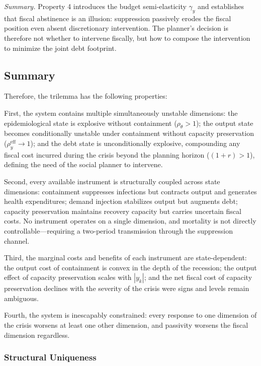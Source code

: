 \documentclass[12pt, a4paper]{article}
\begin{document}
\vspace{5mm}

\noindent\textit{Summary.} Property 4 introduces the budget semi-elasticity $\gamma_y$ and establishes that fiscal abstinence is an illusion: suppression passively erodes the fiscal position even absent discretionary intervention. The planner's decision is therefore not whether to intervene fiscally, but how to compose the intervention to minimize the joint debt footprint. 

\subsection{Summary}
\label{sec:Sumary}
Therefore, the trilemma has the following properties: 

First, the system contains multiple simultaneously unstable dimensions: the epidemiological state is explosive without containment ($\rho_\theta > 1$); the output state becomes conditionally unstable under containment without capacity preservation ($\rho_y^{\text{eff}} \to 1$); and the debt state is unconditionally explosive, compounding any fiscal cost incurred during the crisis beyond the planning horizon ($(1+r) > 1$), defining the need of the social planner to intervene. 

Second, every available instrument is structurally coupled across state dimensions: containment suppresses infections but contracts output and generates health expenditures; demand injection stabilizes output but augments debt; capacity preservation maintains recovery capacity but carries uncertain fiscal costs. No instrument operates on a single dimension, and mortality is not directly controllable---requiring a two-period transmission through the suppression channel. 

Third, the marginal costs and benefits of each instrument are state-dependent: the output cost of containment is convex in the depth of the recession; the output effect of capacity preservation scales with $|y_k|$; and the net fiscal cost of capacity preservation declines with the severity of the crisis were signs and levels remain ambiguous.

Fourth, the system is inescapably constrained: every response to one dimension of the crisis worsens at least one other dimension, and passivity worsens the fiscal dimension regardless.

\subsubsection*{Structural Uniqueness}
\end{document}
